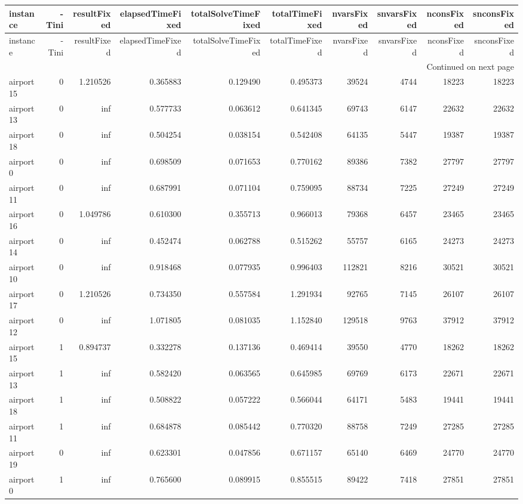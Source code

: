 
\begin{longtable}{|l|r|r|r|r|r|r|r|r|r|}
\toprule
instance & -Tini & resultFixed & elapsedTimeFixed & totalSolveTimeFixed & totalTimeFixed & nvarsFixed & snvarsFixed & nconsFixed & snconsFixed \\
\midrule
\endfirsthead
\toprule
instance & -Tini & resultFixed & elapsedTimeFixed & totalSolveTimeFixed & totalTimeFixed & nvarsFixed & snvarsFixed & nconsFixed & snconsFixed \\
\midrule
\endhead
\midrule
\multicolumn{10}{r}{Continued on next page} \\
\midrule
\endfoot
\bottomrule
\endlastfoot
airport15 & 0 & 1.210526 & 0.365883 & 0.129490 & 0.495373 & 39524 & 4744 & 18223 & 18223 \\
airport13 & 0 & inf & 0.577733 & 0.063612 & 0.641345 & 69743 & 6147 & 22632 & 22632 \\
airport18 & 0 & inf & 0.504254 & 0.038154 & 0.542408 & 64135 & 5447 & 19387 & 19387 \\
airport0 & 0 & inf & 0.698509 & 0.071653 & 0.770162 & 89386 & 7382 & 27797 & 27797 \\
airport11 & 0 & inf & 0.687991 & 0.071104 & 0.759095 & 88734 & 7225 & 27249 & 27249 \\
airport16 & 0 & 1.049786 & 0.610300 & 0.355713 & 0.966013 & 79368 & 6457 & 23465 & 23465 \\
airport14 & 0 & inf & 0.452474 & 0.062788 & 0.515262 & 55757 & 6165 & 24273 & 24273 \\
airport10 & 0 & inf & 0.918468 & 0.077935 & 0.996403 & 112821 & 8216 & 30521 & 30521 \\
airport17 & 0 & 1.210526 & 0.734350 & 0.557584 & 1.291934 & 92765 & 7145 & 26107 & 26107 \\
airport12 & 0 & inf & 1.071805 & 0.081035 & 1.152840 & 129518 & 9763 & 37912 & 37912 \\
airport15 & 1 & 0.894737 & 0.332278 & 0.137136 & 0.469414 & 39550 & 4770 & 18262 & 18262 \\
airport13 & 1 & inf & 0.582420 & 0.063565 & 0.645985 & 69769 & 6173 & 22671 & 22671 \\
airport18 & 1 & inf & 0.508822 & 0.057222 & 0.566044 & 64171 & 5483 & 19441 & 19441 \\
airport11 & 1 & inf & 0.684878 & 0.085442 & 0.770320 & 88758 & 7249 & 27285 & 27285 \\
airport19 & 0 & inf & 0.623301 & 0.047856 & 0.671157 & 65140 & 6469 & 24770 & 24770 \\
airport0 & 1 & inf & 0.765600 & 0.089915 & 0.855515 & 89422 & 7418 & 27851 & 27851 \\

\end{longtable}
